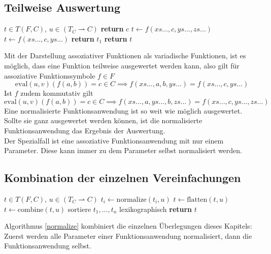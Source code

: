 \documentclass{scrartcl}
\begin{document}
\subsection{Teilweise Auswertung}
\begin{algorithm}
\caption{$\mathrm{combine} \colon T \times (T_C \rightharpoonup C) \rightarrow T$}\label{combine}
\begin{algorithmic}[1] %
\Require $t \in T(F, C)$, $u \in (T_C \rightharpoonup C)$
	\State \textbf{return} $c$ 
			\State $t \leftarrow f(xs..., c, ys..., zs...)$
		\EndWhile
	\Else
			\State $t \leftarrow f(xs..., c, ys...)$
		\EndWhile
	\EndIf
		\State \textbf{return} $t_1$ 
	\EndIf
\EndIf
\State \textbf{return} $t$ 
\end{algorithmic}
\end{algorithm}

Mit der Darstellung assoziativer Funktionen als variadische Funktionen, ist es möglich, dass eine Funktion teilweise ausgewertet werden kann, also gilt für assoziative Funktionssymbole $f \in F$
$$\mathrm{eval}(u, v)(f(a, b)) = c \in C \implies f(xs..., a, b, ys...) = f(xs..., c, ys...)$$
Ist $f$ zudem kommutativ gilt 
$$\mathrm{eval}(u, v)(f(a, b)) = c \in C \implies f(xs..., a, ys..., b, zs...) = f(xs..., c, ys..., zs...)$$
Eine normalisierte Funktionsanwendung ist so weit wie möglich ausgewertet. Sollte sie ganz ausgewertet werden können, ist die normalisierte Funktionsanwendung das Ergebnis der Auswertung. \\
Der Spezialfall ist eine assoziative Funktionsanwendung mit nur einem Parameter. Diese kann immer zu dem Parameter selbst normalisiert werden. 

\subsection{Kombination der einzelnen Vereinfachungen}

\begin{algorithm}
\caption{$\mathrm{normalize} \colon T \times (T_C \rightharpoonup C) \rightarrow T$}\label{normalize}
\begin{algorithmic}[1] %
\Require $t \in T(F, C)$, $u \in (T_C \rightharpoonup C)$
		\State $t_i \leftarrow \mathrm{normalize}(t_i, u)$
	\EndFor
\EndIf
\State $t \leftarrow \mathrm{flatten}(t, u)$
\State $t \leftarrow \mathrm{combine}(t, u)$
	\State sortiere $t_1, \dots, t_n$ lexikographisch
\EndIf
\State \textbf{return} $t$ 
\end{algorithmic}
\end{algorithm}
Algorithmus \ref{normalize} kombiniert die einzelnen Überlegungen dieses Kapitels: Zuerst werden alle Parameter einer Funktionsanwendung normalisiert, dann die Funktionsanwendung selbst.
\end{document}
